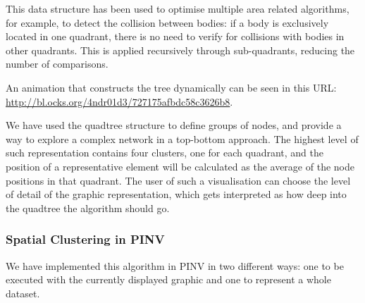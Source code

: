 This data structure has been used to optimise multiple area related algorithms, for example, to detect the collision between bodies: if a body is exclusively located in one quadrant, there is no need to verify for collisions with bodies in other quadrants. This is applied recursively through sub-quadrants, reducing the number of comparisons.

An animation that constructs the tree dynamically can be seen in this URL: \url{http://bl.ocks.org/4ndr01d3/727175afbdc58c3626b8}.

We have used the quadtree structure to define groups of nodes, and provide a way to explore a complex network in a top-bottom approach. The highest level of such representation contains four clusters, one for each quadrant, and the position of a representative element will be calculated as the average of the node positions in that quadrant. The user of such a visualisation can choose the level of detail of the graphic representation, which gets interpreted as how deep into the quadtree the algorithm should go.

\subsubsection{Spatial Clustering in PINV}
We have implemented this algorithm in PINV in two different ways: one to be executed with the currently displayed graphic and one to represent a whole dataset.

